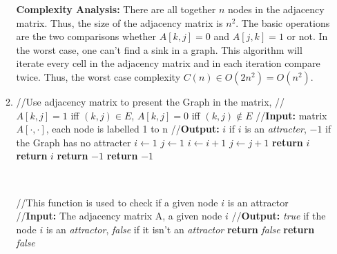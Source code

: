 \documentclass[11pt]{article}
\begin{document}
\begin{enumerate}
\begin{enumerate}
\textbf{Complexity Analysis:} There are all together $n$ nodes in the adjacency matrix. Thus, the size of the adjacency matrix is $n^2$. The basic operations are the two comparisons whether $A[k, j] = 0$ and $A[j, k] = 1$ or not. In the worst case, one can't find a sink in a graph. This algorithm will iterate every cell in the adjacency matrix and in each iteration compare twice. Thus, the worst case complexity $C(n)\in O(2n^2)=O(n^2)$.
\bigskip \\
\item
\begin{algorithmic}[1]
	\State //Use adjacency matrix to present the Graph in the matrix, 
	\State //$A[k, j] = 1$ iff $(k, j) \in E$, $A[k, j] = 0$ iff $(k, j) \notin E$
	\State //\textbf{Input:} matrix $A[\cdot,\cdot]$, each node is labelled 1 to n
	\State //\textbf{Output:} $i$ if $i$ is an \textit{attracter}, $-1$ if the Graph has no attracter
	\State $i\gets 1$
	\State $j\gets 1$
			\State $i\gets i+1$
		\Else
			\State $j\gets j+1$
		\EndIf
	\EndWhile
	\State \textbf{return} $i$
		\State \textbf{return} $i$
	\Else
		\State \textbf{return} $-1$
	\EndIf
	\State \textbf{return} $-1$
\EndFunction
\end{algorithmic}
~
\begin{algorithmic}[1]
	\State //This function is used to check if a given node $i$ is an attractor
	\State //\textbf{Input:} The adjacency matrix A, a given node $i$
	\State //\textbf{Output:} \emph{true} if the node $i$ is an \emph{attractor}, \emph{false} if it isn't an \emph{attractor}
			\State \textbf{return} \emph{false}
		\EndIf
	\EndFor
				\State \textbf{return} \emph{false}

\end{algorithmic}
\end{enumerate}
\end{enumerate}
\end{document}
